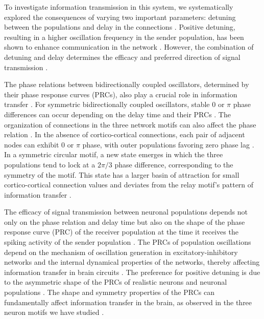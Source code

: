 \documentclass[../main.tex]{subfiles}
\begin{document}
To investigate information transmission in this system, we systematically explored the consequences of varying two important parameters: detuning between the populations and delay in the connections \citep{pariz_transmission_2021}.
Positive detuning, resulting in a higher oscillation frequency in the sender population, has been shown to enhance communication in the network \citep{sancristobal_role_2014, kirst_dynamic_2016, palmigiano_flexible_2017-1, pariz_high_2018, pariz_transmission_2021}.
However, the combination of detuning and delay determines the efficacy and preferred direction of signal transmission \citep{pariz_transmission_2021}.

The phase relations between bidirectionally coupled oscillators, determined by their phase response curves (PRCs), also play a crucial role in information transfer \citep{pariz_transmission_2021}.
For symmetric bidirectionally coupled oscillators, stable $0$ or $\pi$ phase differences can occur depending on the delay time and their PRCs \citep{gollo_dynamic_2010, gollo_mechanisms_2014, mirasso_anticipated_2017}.
The organization of connections in the three network motifs can also affect the phase relation \citep{gollo_dynamic_2010, gollo_mechanisms_2014, mirasso_anticipated_2017}.
In the absence of cortico-cortical connections, each pair of adjacent nodes can exhibit $0$ or $\pi$ phase, with outer populations favoring zero phase lag \citep{gollo_dynamic_2010, gollo_mechanisms_2014, mirasso_anticipated_2017}. 
In a symmetric circular motif, a new state emerges in which the three populations tend to lock at a $2\pi/3$ phase difference, corresponding to the symmetry of the motif.
This state has a larger basin of attraction for small cortico-cortical connection values and deviates from the relay motif's pattern of information transfer \citep{gollo_dynamic_2010, gollo_mechanisms_2014, mirasso_anticipated_2017}. 

The efficacy of signal transmission between neuronal populations depends not only on the phase relation and delay time but also on the shape of the phase response curve (PRC) of the receiver population at the time it receives the spiking activity of the sender population \citep{pariz_transmission_2021}.
The PRCs of population oscillations depend on the mechanism of oscillation generation in excitatory-inhibitory networks and the internal dynamical properties of the networks, thereby affecting information transfer in brain circuits \citep{dumont_macroscopic_2019}.
The preference for positive detuning is due to the asymmetric shape of the PRCs of realistic neurons and neuronal populations \citep{sadeghi_synchronization_2014, dumont_macroscopic_2019, pariz_transmission_2021}.
The shape and symmetry properties of the PRCs can fundamentally affect information transfer in the brain, as observed in the three neuron motifs we have studied \citep{pariz_transmission_2021}.
\end{document}
